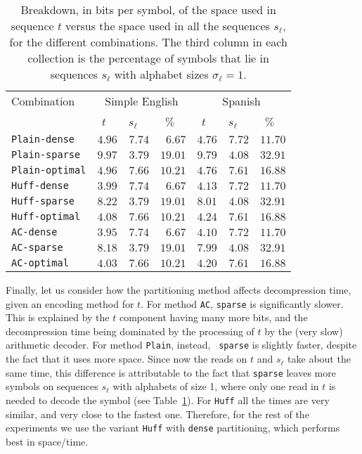 \documentclass[11pt]{article}
\begin{document}
\begin{table}[tb]
\begin{center}
\begin{tabular}{l|rrr|rrr}
Combination & \multicolumn{3}{c|}{Simple English} & \multicolumn{3}{c}{Spanish}  \\
	    & $t$~~ & $s_\ell$~~ & $\%$~~ & $t$~~ & $s_\ell$~~ & $\%$~~ \\
\hline
{\tt Plain-dense}    & $4.96$ & $ 7.74$ & $ 6.67$ & $ 4.76$ & $ 7.72$ & $ 11.70$ \\
{\tt Plain-sparse}	& $9.97$ & $ 3.79$ & $ 19.01$ & $9.79$ & $ 4.08$ & $ 32.91$ \\
{\tt Plain-optimal}	& $4.96$ & $ 7.66$ & $ 10.21$ & $4.76$ & $ 7.61$ & $ 16.88$ \\
{\tt Huff-dense}	  & $3.99$ & $ 7.74$ & $ 6.67$ & $ 4.13$ & $ 7.72$ & $ 11.70$ \\
{\tt Huff-sparse}	  & $8.22$ & $ 3.79$ & $ 19.01$ & $8.01$ & $ 4.08$ & $ 32.91$ \\
{\tt Huff-optimal}	& $4.08$ & $ 7.66$ & $ 10.21$ & $4.24$ & $ 7.61$ & $ 16.88$ \\
{\tt AC-dense}		  & $3.95$ & $ 7.74$ & $ 6.67$ & $ 4.10$ & $ 7.72$ & $ 11.70$ \\
{\tt AC-sparse}		  & $8.18$ & $ 3.79$ & $ 19.01$ & $7.99$ & $ 4.08$ & $ 32.91$ \\
{\tt AC-optimal}	  & $4.03$ & $ 7.66$ & $ 10.21$ & $4.20$ & $ 7.61$ & $ 16.88$ \\
\end{tabular}
\caption{Breakdown, in bits per symbol, of the space used in sequence $t$
versus the space used in all the sequences $s_\ell$, for the different
combinations. The third column in each collection is the percentage of symbols
that lie in sequences $s_\ell$ with alphabet sizes $\sigma_\ell=1$.}
\label{tab:breakdown}
\end{center}
\end{table}

Finally, let us consider how the partitioning method affects decompression 
time, given an encoding method for $t$. For method {\tt AC}, {\tt sparse} is
significantly slower. This is explained by the $t$ component having many
more bits, and the decompression time being dominated by the processing of $t$
by the (very slow) arithmetic decoder. For method {\tt Plain}, instead, {\tt 
sparse} is slightly faster, despite the fact that it uses more space. Since now 
the reads on $t$ and $s_\ell$ take about the same time, this difference is 
attributable to the fact that {\tt sparse} leaves more symbols on sequences 
$s_\ell$ with alphabets of size 1, where only one read in $t$ is needed to 
decode the symbol (see Table~\ref{tab:breakdown}).
For {\tt Huff} all the times are very similar, and very close to the fastest
one. Therefore, for the rest of the experiments we use the variant {\tt Huff}
with {\tt dense} partitioning, which performs best in space/time.
\end{document}
